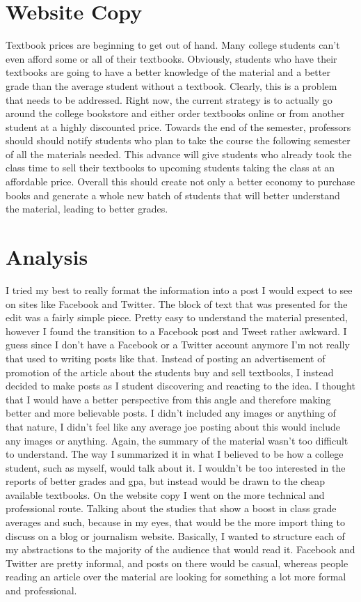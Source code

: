\documentclass[10pt,letterpaper]{article}
\begin{document}
\section*{Website Copy}
Textbook prices are beginning to get out of hand. Many college students can't even afford some or all of their textbooks. Obviously, students who have their textbooks are going to have a better knowledge of the material and a better grade than the average student without a textbook. Clearly, this is a problem that needs to be addressed. Right now, the current strategy is to actually go around the college bookstore and either order textbooks online or from another student at a highly discounted price. Towards the end of the semester, professors should should notify students who plan to take the course the following semester of all the materials needed. This advance will give students who already took the class time to sell their textbooks to upcoming students taking the class at an affordable price. Overall this should create not only a better economy to purchase books and generate a whole new batch of students that will better understand the material, leading to better grades. 

\section*{Analysis}
I tried my best to really format the information into a post I would expect to see on sites like Facebook and Twitter. The block of text that was presented for the edit was a fairly simple piece. Pretty easy to understand the material presented, however I found the transition to a Facebook post and Tweet rather awkward. I guess since I don't have a Facebook or a Twitter account anymore I'm not really that used to writing posts like that. Instead of posting an advertisement of promotion of the article about the students buy and sell textbooks, I instead decided to make posts as I student discovering and reacting to the idea. I thought that I would have a better perspective from this angle and therefore making better and more believable posts. I didn't included any images or anything of that nature, I didn't feel like any average joe posting about this would include any images or anything. Again, the summary of the material wasn't too difficult to understand. The way I summarized it in what I believed to be how a college student, such as myself, would talk about it. I wouldn't be too interested in the reports of better grades and gpa, but instead would be drawn to the cheap available textbooks. On the website copy I went on the more technical and professional route. Talking about the studies that show a boost in class grade averages and such, because in my eyes, that would be the more import thing to discuss on a blog or journalism website. Basically, I wanted to structure each of my abstractions to the majority of the audience that would read it. Facebook and Twitter are pretty informal, and posts on there would be casual, whereas people reading an article over the material are looking for something a lot more formal and professional.  
\end{document}
